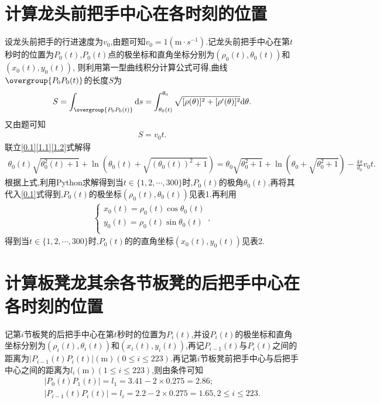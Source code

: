 \documentclass[lang=cn,newtx,10pt,scheme=chinese]{../Template/elegantbook}
\begin{document}
\section{计算龙头前把手中心在各时刻的位置}\label{1.(2)}

设龙头前把手的行进速度为\(v_0\),由题可知\(v_0 = 1(\mathrm{m}\cdot s^{-1})\).记龙头前把手中心在第\(t\)秒时的位置为\(P_0(t)\),\(P_0(t)\)点的极坐标和直角坐标分别为\((\rho _0(t),\theta _0(t))\)和\((x_0(t),y_0(t))\),
则利用第一型曲线积分计算公式可得,曲线\(\overgroup{P_0P_0(t)}\)的长度\(S\)为
\begin{align}
S=\int_{\overgroup{P_0P_0(t)}}{\mathrm{d}s}=\int_{\theta _0(t)}^{\theta _0}{\sqrt{[\rho (\theta )]^2+[\rho ' (\theta )]^2}\mathrm{d}\theta}.\label{1.1}
\end{align}
又由题可知
\begin{align}
S = v_0t.\label{1.2}
\end{align}
联立\eqref{0.1}\eqref{1.1}\eqref{1.2}式解得
\begin{align}
\theta _0(t)\sqrt{\theta _{0}^{2}(t)+1}+\ln (\theta _0(t)+\sqrt{(\theta _0(t))^2+1}) =\theta _0\sqrt{\theta _{0}^{2}+1}+\ln (\theta _0+\sqrt{\theta _{0}^{2}+1}) -\frac{4\pi}{d_0}v_0t .
\end{align}
根据上式,利用Python求解得到当\(t\in \{ 1,2,\cdots ,300 \}\)时,\(P_0(t)\)的极角\(\theta _0(t)\),再将其代入\eqref{0.1}式得到,\(P_0(t)\)的极坐标\((\rho _0(t),\theta _0(t))\)见表1.再利用
\begin{align}
\begin{cases}
x_0(t)=\rho _0(t)\cos \theta _0(t)\\
y_0(t)=\rho _0(t)\sin \theta _0(t)\\
\end{cases},
\end{align}
得到当\(t\in \{ 1,2,\cdots ,300 \}\)时,\(P_0(t)\)的的直角坐标\((x_0(t),y_0(t))\)见表2.

\section{计算板凳龙其余各节板凳的后把手中心在各时刻的位置}

记第\(i\)节板凳的后把手中心在第\(t\)秒时的位置为\(P_{i}(t)\),并设\(P_{i}(t)\)的极坐标和直角坐标分别为\((\rho _{i}(t),\theta _{i}(t))\)和\((x_{i}(t),y_{i}(t))\),再记\(P_{i-1}(t)\)与\(P_{i}(t)\)之间的距离为\(| P_{i-1}(t)P_{i}(t)|(\mathrm{m}) (0\leqslant i\leqslant 223)\).再记第$i$节板凳前把手中心与后把手中心之间的距离为\(l_i(\mathrm{m})(1\leq i\leq 223)\),则由条件可知
\begin{gather}
| P_0(t)P_1(t)| = l_1 = 3.41 - 2\times 0.275 = 2.86;
\\
| P_{i-1}(t)P_{i}(t)| = l_i = 2.2 - 2\times 0.275 = 1.65,2\leqslant i\leqslant 223.
\end{gather}
\end{document}
